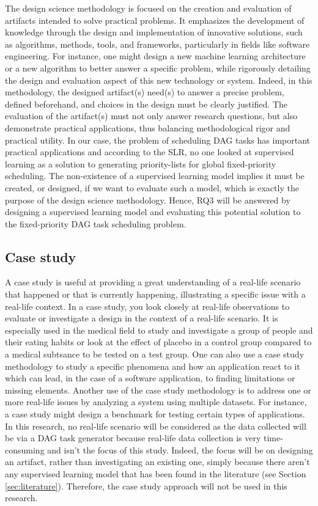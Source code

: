 The design science methodology is focused on the creation and evaluation 
of artifacts intended to solve practical problems. It emphasizes 
the development of knowledge through the design and implementation 
of innovative solutions, such as algorithms, methods, tools, 
and frameworks, particularly in fields like software engineering\cite{Wieringa2010DesignScienceMethod}.
For instance, one might design a new machine learning architecture or a new algorithm to 
better answer a specific problem, while rigorously detailing the design and evaluation aspect of this new technology or system.
Indeed, in this methodology,
the designed artifact(s) need(s) to answer a precise problem,
defined beforehand, and choices in the design must be clearly justified.
The evaluation of the artifact(s) must not only answer research questions, but also
demonstrate practical applications,
thus balancing methodological rigor and practical utility.
In our case, the problem of scheduling DAG tasks
has important practical applications and according to the SLR, 
no one looked at supervised learning as a solution to generating priority-lists for 
global fixed-priority scheduling.
The non-existence of a supervised learning model implies it must be created, or designed,
if we want to evaluate such a model,
which is exactly the purpose of the design science methodology.
Hence, RQ3 will be answered by designing a supervised learning model and evaluating this potential solution to the fixed-priority DAG task scheduling problem.

\subsection{Case study}

A case study is useful at providing a great understanding of a real-life scenario that happened 
or that is currently happening, illustrating a specific issue with a real-life context.
In a case study, you look closely at real-life observations to evaluate or investigate
a design in the context of a real-life scenario\cite{sarah2011caseStudy}.
It is especially used in the medical field to study and investigate a group of people and their 
eating habits or look at the effect of placebo in a control group compared to a medical subtsance to be tested
on a test group.
One can also use a case study methodology to study a specific phenomena and how an application react to it
which can lead, in the case of a software application, to finding
limitations or missing elements.
Another use of the case study methodology is 
to address one or more real-life issues by analyzing 
a system using multiple datasets.
For instance, a case study might design a benchmark for testing 
certain types of applications.
In this research, no real-life scenario will be considered as 
the data collected will be via a DAG task generator because real-life data collection is very time-consuming
and isn't the focus of this study.
Indeed, the focus will be on designing an artifact,
rather than investigating an existing one, simply because there aren't any supervised 
learning model that has been found in the literature (see Section \ref{sec:literature}). 
Therefore, the case study approach will not be used in this research.


